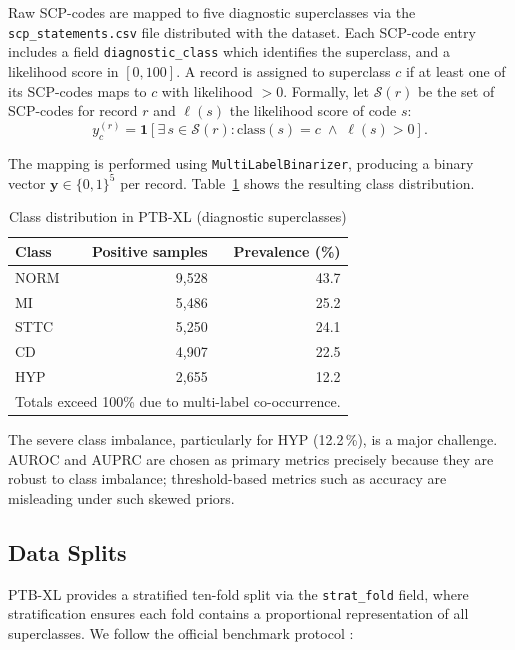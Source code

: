 Raw SCP-codes are mapped to five diagnostic superclasses via the
\texttt{scp\_statements.csv} file distributed with the dataset.
Each SCP-code entry includes a field \texttt{diagnostic\_class} which
identifies the superclass, and a likelihood score in $[0,100]$.
A record is assigned to superclass $c$ if at least one of its SCP-codes
maps to $c$ with likelihood $> 0$.
Formally, let $\mathcal{S}(r)$ be the set of SCP-codes for record $r$
and $\ell(s)$ the likelihood score of code $s$:
\begin{equation}
  y_c^{(r)} = \mathbf{1}\!\left[
    \exists\, s \in \mathcal{S}(r)\colon
    \text{class}(s) = c \;\wedge\; \ell(s) > 0
  \right].
  \label{eq:label}
\end{equation}

The mapping is performed using \texttt{MultiLabelBinarizer}, producing a
binary vector $\mathbf{y} \in \{0,1\}^{5}$ per record.
Table~\ref{tab:class_dist} shows the resulting class distribution.

\begin{table}[htbp]
  \centering
  \caption{Class distribution in PTB-XL (diagnostic superclasses)}
  \label{tab:class_dist}
  \begin{tabular}{lrr}
    \hline
    \textbf{Class} & \textbf{Positive samples} & \textbf{Prevalence (\%)} \\
    \hline
    NORM  & 9{,}528  & 43.7 \\
    MI    & 5{,}486  & 25.2 \\
    STTC  & 5{,}250  & 24.1 \\
    CD    & 4{,}907  & 22.5 \\
    HYP   & 2{,}655  & 12.2 \\
    \hline
    \multicolumn{3}{l}{\footnotesize Totals exceed 100\% due to multi-label co-occurrence.}
  \end{tabular}
\end{table}

\noindent The severe class imbalance, particularly for HYP
(12.2\,\%), is a major challenge.
AUROC and AUPRC are chosen as primary metrics precisely because they are
robust to class imbalance; threshold-based metrics such as accuracy are
misleading under such skewed priors.

\subsection{Data Splits}

PTB-XL provides a stratified ten-fold split via the \texttt{strat\_fold}
field, where stratification ensures each fold contains a proportional
representation of all superclasses.
We follow the official benchmark protocol \cite{ref6}:

